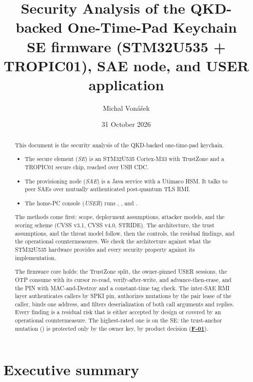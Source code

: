\documentclass[11pt,a4paper]{article}
\title{Security Analysis of the QKD-backed One-Time-Pad Keychain\\[4pt]
\large SE firmware (STM32U535 + TROPIC01), SAE node, and USER application}
\author{Michal Vonášek}
\date{31 October 2026}
\newcommand{\fid}[1]{\textbf{#1}}
\begin{document}
\maketitle

\begin{abstract}
\noindent This document is the security analysis of the QKD-backed one-time-pad keychain.
\begin{itemize}
\item The secure element (\emph{SE}) is an STM32U535 Cortex-M33 with TrustZone and a TROPIC01 secure chip, reached over USB CDC.
\item The provisioning node (\emph{SAE}) is a Java service with a Utimaco HSM. It talks to peer SAEs over mutually authenticated post-quantum TLS RMI.
\item The home-PC console (\emph{USER}) runs , , and .
\end{itemize}
The methods come first: scope, deployment assumptions, attacker models, and the scoring scheme (CVSS v3.1, CVSS v4.0, STRIDE). The architecture, the trust assumptions, and the threat model follow, then the controls, the residual findings, and the operational countermeasures. We check the architecture against what the STM32U535 hardware provides and every security property against its implementation.

The firmware core holds: the TrustZone split, the owner-pinned USER sessions, the OTP consume with its cursor re-read, verify-after-write, and advance-then-erase, and the PIN with MAC-and-Destroy and a constant-time tag check. The inter-SAE RMI layer authenticates callers by SPKI pin, authorizes mutations by the pair lease of the caller, binds one address, and filters deserialization of both call arguments and replies. Every finding is a residual risk that is either accepted by design or covered by an operational countermeasure. The highest-rated one is on the SE: the trust-anchor mutation () is protected only by the owner key, by product decision (\hyperref[f:F-01]{\fid{F-01}}).
\end{abstract}

\tableofcontents
\clearpage

\section{Executive summary}
\end{document}
